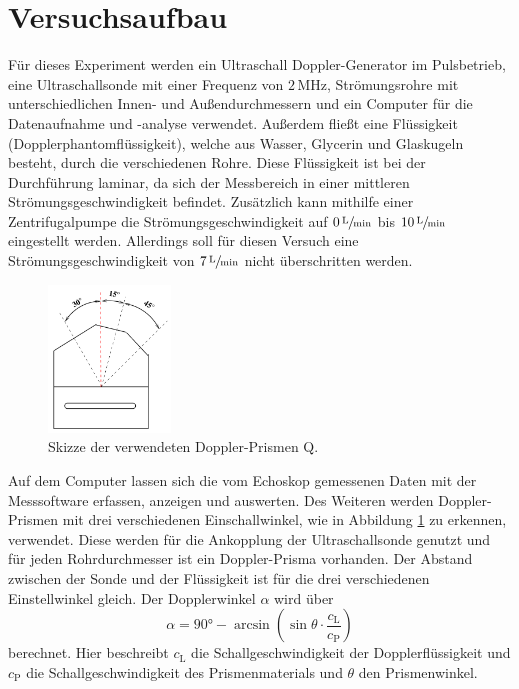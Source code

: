 \section{Versuchsaufbau}
\label{sec:Versuchsaufbau}
Für dieses Experiment werden ein Ultraschall Doppler-Generator im Pulsbetrieb, eine Ultraschallsonde mit einer Frequenz von $2\,\unit{\mega\hertz}$, 
Strömungsrohre mit unterschiedlichen Innen- und Außendurchmessern und ein Computer für die Datenaufnahme und -analyse verwendet. Außerdem fließt eine Flüssigkeit (Dopplerphantomflüssigkeit), welche aus Wasser, Glycerin und Glaskugeln besteht, durch die verschiedenen Rohre. 
Diese Flüssigkeit ist bei der Durchführung laminar, da sich der Messbereich in einer mittleren
Strömungsgeschwindigkeit befindet. Zusätzlich kann mithilfe einer Zentrifugalpumpe die Strömungsgeschwindigkeit auf $0\,\sfrac{\unit{\liter}}{\unit{\minute}}$ bis $10\,\sfrac{\unit{\liter}}{\unit{\minute}}$
eingestellt werden. Allerdings soll für diesen Versuch eine Strömungsgeschwindigkeit von $7\,\sfrac{\unit{\liter}}{\unit{\minute}}$ nicht überschritten werden. 
\begin{figure}
    \centering
    \includegraphics[width=0.29\textwidth]{content/Bilder/Prisma.jpeg}
    \caption{Skizze der verwendeten Doppler-Prismen Q\cite{anleitungUS3}.}
    \label{fig:Prisma}
\end{figure}
Auf dem Computer lassen sich die vom Echoskop gemessenen Daten 
mit der Messsoftware erfassen, anzeigen und auswerten.  
Des Weiteren werden Doppler-Prismen mit drei verschiedenen Einschallwinkel, wie in Abbildung \ref{fig:Prisma} zu erkennen, verwendet. Diese werden für die Ankopplung der Ultraschallsonde genutzt und für jeden Rohrdurchmesser
ist ein Doppler-Prisma vorhanden. Der Abstand zwischen der Sonde und der Flüssigkeit ist für die drei verschiedenen Einstellwinkel gleich. Der Dopplerwinkel $\alpha$ wird über 
\begin{equation}
    \alpha = 90°-\arcsin\left( \sin \theta \cdot \frac{c_{\text{L}}}{c_{\text{P}}}\right)
    \label{eqn:Dopplerwinkel}
\end{equation}
berechnet. Hier beschreibt $c_{\text{L}}$ die Schallgeschwindigkeit der Dopplerflüssigkeit und $c_{\text{P}}$ die Schallgeschwindigkeit des Prismenmaterials und $\theta$ den Prismenwinkel.

